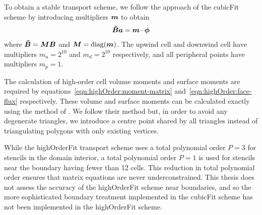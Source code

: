 To obtain a stable transport scheme, we follow the approach of the cubicFit scheme by introducing multipliers $\bm{m}$ to obtain
\begin{align}
	\bm{\tilde{B}} \bm{a} = \bm{m} \cdot \bm{\phi}
\end{align}
where $\bm{\tilde{B}} = \bm{M} \bm{B}$ and $\bm{M} = \mathrm{diag}(\bm{m})$.
The upwind cell and downwind cell have multipliers $m_u = 2^{10}$ and $m_d = 2^{10}$ respectively, and all peripheral points have multipliers $m_p = 1$.

The calculation of high-order cell volume moments and surface moments are required by equations~\eqref{eqn:highOrder:moment-matrix} and~\eqref{eqn:highOrder:face-flux} respectively.  These volume and surface moments can be calculated exactly using the method of \citet{tuzikov2003}.
We follow their method but, in order to avoid any degenerate triangles, we introduce a centre point shared by all triangles instead of triangulating polygons with only existing vertices.

While the highOrderFit transport scheme uses a total polynomial order $P = 3$ for stencils in the domain interior, a total polynomial order $P = 1$ is used for stencils near the boundary having fewer than 12 cells.
This reduction in total polynomial order ensures that matrix equations are never underconstrained.
This thesis does not assess the accuracy of the highOrderFit scheme near boundaries, and so the more sophisticated boundary treatment implemented in the cubicFit scheme has not been implemented in the highOrderFit scheme.

